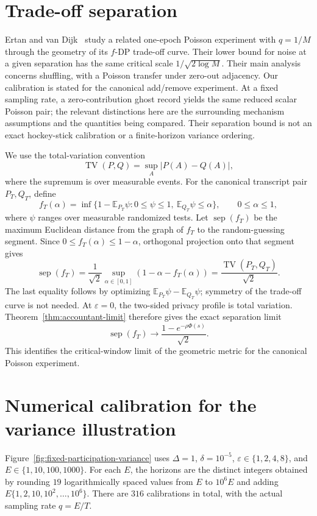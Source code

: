 \documentclass[11pt]{article}
\theoremstyle{remark}
\newcommand{\E}{\mathbb E}
\newcommand{\TV}{\operatorname{TV}}
\begin{document}
\section{Trade-off separation}\label{app:separation}
Ertan and van Dijk~\cite{ertanvandijk2026} study a related one-epoch Poisson
experiment with $q=1/M$ through the geometry of its $f$-DP trade-off curve.
Their lower bound for noise at a given separation has the same critical scale
$1/\sqrt{2\log M}$. Their main analysis concerns shuffling, with a Poisson
transfer under zero-out adjacency. Our calibration is stated for the
canonical add/remove experiment. At a fixed sampling rate, a zero-contribution
ghost record yields the same reduced scalar Poisson pair; the relevant
distinctions here are the surrounding mechanism assumptions and the
quantities being compared. Their separation bound is not an exact
hockey-stick calibration or a finite-horizon variance ordering.

We use the total-variation convention
\[
 \TV(P,Q)=\sup_A|P(A)-Q(A)|,
\]
where the supremum is over measurable events.
For the canonical transcript pair $P_T,Q_T$, define
\[
 f_T(\alpha)=\inf\{1-\E_{P_T}\psi:
     0\leq\psi\leq1,\ \E_{Q_T}\psi\leq\alpha\},
 \qquad0\leq\alpha\leq1,
\]
where $\psi$ ranges over measurable randomized tests. Let
$\operatorname{sep}(f_T)$ be the maximum Euclidean distance from the graph
of $f_T$ to the random-guessing segment. Since
$0\leq f_T(\alpha)\leq1-\alpha$, orthogonal projection onto that segment gives
\[
 \operatorname{sep}(f_T)
 =\frac1{\sqrt2}\sup_{\alpha\in[0,1]}(1-\alpha-f_T(\alpha))
 =\frac{\TV(P_T,Q_T)}{\sqrt2}.
\]
The last equality follows by optimizing
$\E_{P_T}\psi-\E_{Q_T}\psi$; symmetry of the trade-off curve is not needed.
At $\varepsilon=0$, the two-sided privacy profile is total variation.
Theorem~\ref{thm:accountant-limit} therefore gives the exact separation limit
\[
 \operatorname{sep}(f_T)\longrightarrow
 \frac{1-e^{-\rho\Phi(s)}}{\sqrt2}.
\]
This identifies the critical-window limit of the geometric metric for the
canonical Poisson experiment.

\section{Numerical calibration for the variance illustration}
\label{app:numerical-methods}

Figure~\ref{fig:fixed-participation-variance} uses $\Delta=1$,
$\delta=10^{-5}$, $\varepsilon\in\{1,2,4,8\}$, and
$E\in\{1,10,100,1000\}$. For each $E$, the horizons are the distinct
integers obtained by rounding $19$ logarithmically spaced values from $E$
to $10^6E$ and adding $E\{1,2,10,10^2,\ldots,10^6\}$. There are
$316$ calibrations in total, with the actual sampling rate $q=E/T$.
\end{document}
